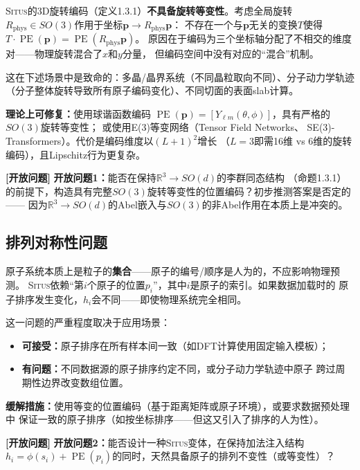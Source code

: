 \documentclass[11pt,a4paper]{article}
\theoremstyle{remark}
\DeclareMathOperator{\PE}{PE}
\newcommand{\R}{\mathbb{R}}
\newcommand{\Situs}{\textsc{Situs}}
\newcommand{\openproblem}{\textnormal{\textbf{[开放问题]}}}
\begin{document}
\Situs{}的3D旋转编码（定义1.3.1）\textbf{不具备旋转等变性}。考虑全局旋转
$R_{\text{phys}} \in SO(3)$作用于坐标$\mathbf{p} \to R_{\text{phys}}\mathbf{p}$：
不存在一个与$\mathbf{p}$无关的变换$T$使得$T \cdot \PE(\mathbf{p}) = \PE(R_{\text{phys}}\mathbf{p})$。
原因在于编码为三个坐标轴分配了不相交的维度对——物理旋转混合了$x$和$y$分量，
但编码空间中没有对应的``混合''机制。

这在下述场景中是致命的：多晶/晶界系统（不同晶粒取向不同）、分子动力学轨迹
（分子整体旋转导致所有原子编码变化）、不同切面的表面slab计算。

\textbf{理论上可修复：}使用球谐函数编码
$\PE(\mathbf{p}) = [Y_{\ell m}(\theta, \phi)]$，具有严格的$SO(3)$旋转等变性；
或使用E(3)等变网络（Tensor Field Networks\cite{thomas2018tfn}、
SE(3)-Transformers\cite{fuchs2020se3}）。代价是编码维度以$(L+1)^2$增长
（$L=3$即需16维 vs 6维的旋转编码），且Lipschitz行为更复杂。

\openproblem{} \textbf{开放问题1：}能否在保持$\R^3 \to SO(d)$的李群同态结构
（命题1.3.1）的前提下，构造具有完整$SO(3)$旋转等变性的位置编码？初步推测答案是否定的——
因为$\R^3 \to SO(d)$的Abel嵌入与$SO(3)$的非Abel作用在本质上是冲突的。

\subsection{排列对称性问题}

原子系统本质上是粒子的\textbf{集合}——原子的编号/顺序是人为的，不应影响物理预测。
\Situs{}依赖``第$i$个原子的位置$p_i$''，其中$i$是原子的索引。如果数据加载时的
原子排序发生变化，$h_i$会不同——即使物理系统完全相同。

这一问题的严重程度取决于应用场景：
\begin{itemize}
    \item \textbf{可接受：}原子排序在所有样本间一致（如DFT计算使用固定输入模板）；
    \item \textbf{有问题：}不同数据源的原子排序约定不同，或分子动力学轨迹中原子
          跨过周期性边界改变数组位置。
\end{itemize}

\textbf{缓解措施：}使用等变的位置编码（基于距离矩阵或原子环境），或要求数据预处理中
保证一致的原子排序（如按坐标排序——但这又引入了排序的人为性）。

\openproblem{} \textbf{开放问题2：}能否设计一种\Situs{}变体，在保持加法注入结构
$h_i = \phi(s_i) + \PE(p_i)$的同时，天然具备原子的排列不变性（或等变性）？
\end{document}
